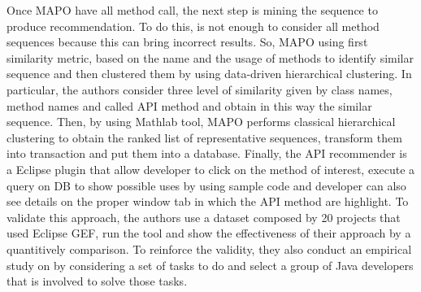 Once MAPO have all method call, the next step is mining the sequence to produce recommendation. To do this, is not enough to consider all method sequences because this can bring incorrect results. So, MAPO using first similarity metric, based on the name and the usage of methods to identify similar sequence and then clustered them by using data-driven hierarchical clustering. In particular, the authors consider three level of similarity given by class names, method names and called API method and obtain in this way the similar sequence. Then, by using Mathlab tool, MAPO performs classical hierarchical clustering to obtain the ranked list of representative sequences, transform them into transaction and put them into a database. Finally, the API recommender is a Eclipse plugin that allow developer to click on the method of interest, execute a query on DB to show possible uses by using sample code and developer can also see details on the proper window tab in which the API method are highlight. To validate this approach, the authors use a dataset composed by 20 projects that used Eclipse GEF, run the tool and show the effectiveness of their approach by a quantitively comparison. To reinforce the validity, they also conduct an empirical study on by considering a set of tasks to do and select a group of Java developers that is involved to solve those tasks.


